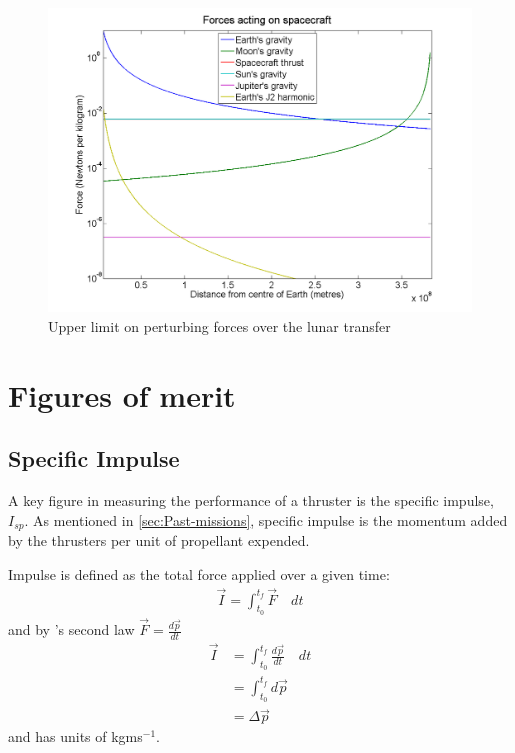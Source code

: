 \begin{figure}[h]
\begin{center}
\includegraphics[scale=0.4]{Images/relative_forces.png}
\end{center}
\caption{Upper limit on perturbing forces over the lunar transfer}
\label{fig:Perturbing-forces}
\end{figure}

\section{Figures of merit}
\subsection{Specific Impulse} \label{sub:Isp}

A key figure in measuring the performance of a thruster is the specific impulse, $I_{sp}$. As mentioned in \autoref{sec:Past-missions}, specific impulse is the momentum added by the thrusters per unit of propellant expended.

Impulse is defined as the total force applied over a given time:
\begin{gather}
\vec{I} = \int_{t_0}^{t_f}\vec{F}\quad dt
\end{gather}
and by \textcite{Newton1687}'s second law $\vec{F} = \frac{d\vec{p}}{dt}$
\begin{align}
\vec{I} &= \int_{t_0}^{t_f}\frac{d\vec{p}}{dt}\quad dt \\
&= \int_{t_0}^{t_f}d\vec{p} \\
&= \Delta\vec{p}
\end{align}
and has units of kgms$^{-1}$. 

